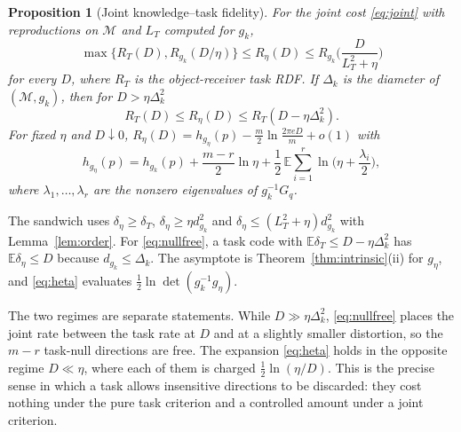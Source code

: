 \documentclass[10pt,journal]{IEEEtran}
\newtheorem{proposition}{Proposition}
\newcommand{\E}{\mathbb E}
\newcommand{\M}{\mathcal M}
\begin{document}
\begin{proposition}[Joint knowledge--task fidelity]\label{prop:joint}
For the joint cost \eqref{eq:joint} with reproductions on $\M$ and $L_T$ computed for $g_k$,
\begin{equation}
 \max\{R_T(D),R_{g_k}(D/\eta)\}\le R_\eta(D)\le R_{g_k}\!\Big(\frac{D}{L_T^2+\eta}\Big) \label{eq:sandwich}
\end{equation}
for every $D$, where $R_T$ is the object-receiver task RDF. If $\Delta_k$ is the diameter of $(\M,g_k)$, then for $D>\eta\Delta_k^2$
\begin{equation}
 R_T(D)\le R_\eta(D)\le R_T(D-\eta\Delta_k^2). \label{eq:nullfree}
\end{equation}
For fixed $\eta$ and $D\downarrow0$, $R_\eta(D)=h_{g_\eta}(p)-\frac m2\ln\frac{2\pi eD}m+o(1)$ with
\begin{equation}
 h_{g_\eta}(p)=h_{g_k}(p)+\frac{m-r}2\ln\eta+\frac12\,\E\sum_{i=1}^r\ln\Big(\eta+\frac{\lambda_i}2\Big), \label{eq:heta}
\end{equation}
where $\lambda_1,\dots,\lambda_r$ are the nonzero eigenvalues of $g_k^{-1}G_q$.
\end{proposition}
\begin{IEEEproof}
The sandwich uses $\delta_\eta\ge\delta_T$, $\delta_\eta\ge\eta d_{g_k}^2$ and $\delta_\eta\le(L_T^2+\eta)d_{g_k}^2$ with Lemma~\ref{lem:order}. For \eqref{eq:nullfree}, a task code with $\E\delta_T\le D-\eta\Delta_k^2$ has $\E\delta_\eta\le D$ because $d_{g_k}\le\Delta_k$. The asymptote is Theorem~\ref{thm:intrinsic}(ii) for $g_\eta$, and \eqref{eq:heta} evaluates $\frac12\ln\det(g_k^{-1}g_\eta)$.
\end{IEEEproof}
The two regimes are separate statements. While $D\gg\eta\Delta_k^2$, \eqref{eq:nullfree} places the joint rate between the task rate at $D$ and at a slightly smaller distortion, so the $m-r$ task-null directions are free. The expansion \eqref{eq:heta} holds in the opposite regime $D\ll\eta$, where each of them is charged $\frac12\ln(\eta/D)$. This is the precise sense in which a task allows insensitive directions to be discarded: they cost nothing under the pure task criterion and a controlled amount under a joint criterion.
\end{document}

